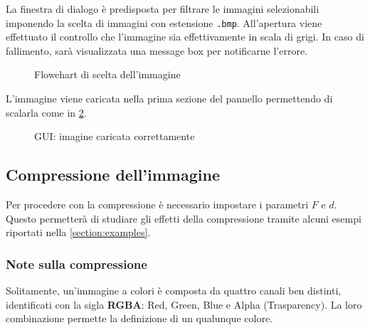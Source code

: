 \documentclass[11pt,italian]{article}
\begin{document}
La finestra di dialogo è predisposta per filtrare le immagini selezionabili imponendo la scelta di immagini con estensione \lstinline{.bmp}. All'apertura viene effettuato il controllo che l'immagine sia effettivamente in scala di grigi. In caso di fallimento, sarà visualizzata una message box per notificarne l'errore.

\begin{figure}[H]
    \caption{Flowchart di scelta dell'immagine}
    \label{fig:flow-image-pick}
\end{figure}

\noindent
L’immagine viene caricata nella prima sezione del pannello permettendo di scalarla come in \cref{fig:application-image-loaded}.
\begin{figure}[H]
    \caption{GUI: imagine caricata correttamente}
    \label{fig:application-image-loaded}
\end{figure}

\subsection{Compressione dell'immagine}
Per procedere con la compressione è necessario impostare i parametri $F$ e $d$. Questo permetterà di studiare gli effetti della compressione tramite alcuni esempi riportati nella \cref{section:examples}.

\subsubsection*{Note sulla compressione}
Solitamente, un’immagine a colori è composta da quattro canali ben distinti, identificati con la sigla \textbf{RGBA}: Red, Green, Blue e Alpha (Trasparency).
La loro combinazione permette la definizione di un qualunque colore.
\end{document}
